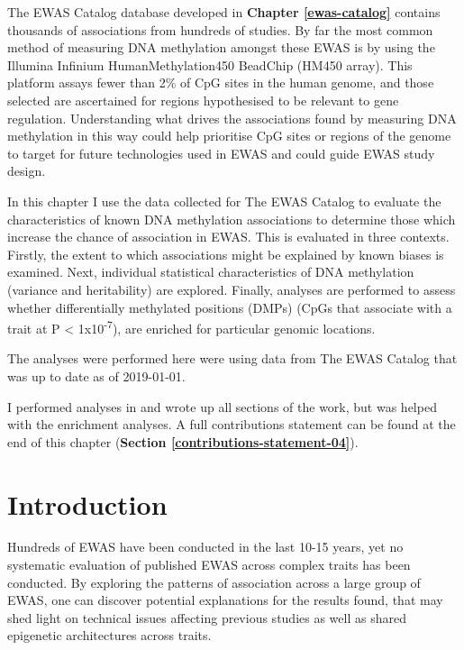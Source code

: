 \documentclass[11pt,oneside]{bristolthesis}
\begin{document}
The EWAS Catalog database developed in \textbf{Chapter \ref{ewas-catalog}} contains thousands of associations from hundreds of studies. By far the most common method of measuring DNA methylation amongst these EWAS is by using the Illumina Infinium HumanMethylation450 BeadChip (HM450 array). This platform assays fewer than 2\% of CpG sites in the human genome, and those selected are ascertained for regions hypothesised to be relevant to gene regulation. Understanding what drives the associations found by measuring DNA methylation in this way could help prioritise CpG sites or regions of the genome to target for future technologies used in EWAS and could guide EWAS study design.

In this chapter I use the data collected for The EWAS Catalog to evaluate the characteristics of known DNA methylation associations to determine those which increase the chance of association in EWAS. This is evaluated in three contexts. Firstly, the extent to which associations might be explained by known biases is examined. Next, individual statistical characteristics of DNA methylation (variance and heritability) are explored. Finally, analyses are performed to assess whether differentially methylated positions (DMPs) (CpGs that associate with a trait at P \textless{} 1x10\textsuperscript{-7}), are enriched for particular genomic locations.

The analyses were performed here were using data from The EWAS Catalog that was up to date as of 2019-01-01.

I performed analyses in and wrote up all sections of the work, but was helped with the enrichment analyses. A full contributions statement can be found at the end of this chapter (\textbf{Section \ref{contributions-statement-04}}).

\hypertarget{introduction-04}{%
\section{Introduction}\label{introduction-04}}

Hundreds of EWAS have been conducted in the last 10-15 years, yet no systematic evaluation of published EWAS across complex traits has been conducted. By exploring the patterns of association across a large group of EWAS, one can discover potential explanations for the results found, that may shed light on technical issues affecting previous studies as well as shared epigenetic architectures across traits.
\end{document}
